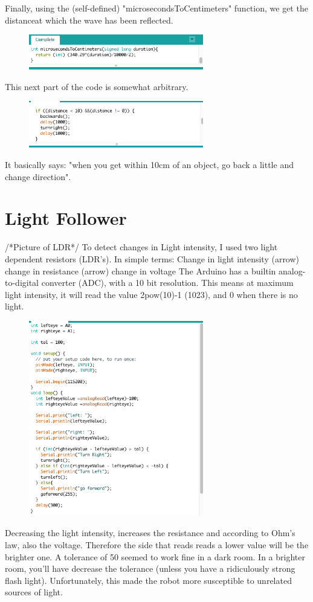 \documentclass[final,3p,times,twocolumn]{elsarticle}
\begin{document}
Finally, using the (self-defined) "microsecondsToCentimeters" function, we get the distanceat which the wave has been reflected.
\begin{figure}[h!]
\includegraphics[trim={0cm 0cm 0cm 0cm}, clip, width=3in]{./media/sonarDistanceFunction.jpg}
\end{figure}
This next part of the code is somewhat arbitrary.
\begin{figure}[h!]
\includegraphics[trim={0cm 0cm 0cm 0cm}, clip, width=3in]{./media/obstacleAvoidance.jpg}
\end{figure}
It basically says: "when you get within 10cm of an object, go back a little and change direction".

\section{Light Follower}
/*Picture of LDR*/
To detect changes in Light intensity, I used two light dependent resistors (LDR's).
In simple terms:
Change in light intensity (arrow) change in resistance (arrow) change in voltage
The Arduino has a builtin analog-to-digital converter (ADC), with a 10 bit resolution.
This means at maximum light intensity, it will read the value 2pow(10)-1 (1023), and 0 when there is no light.
\begin{figure}[h!]
\includegraphics[trim={0cm 0cm 0cm 0cm}, clip, width=3in]{./media/lightFollower.jpg}
\end{figure}
Decreasing the light intensity, increases the resistance and according to Ohm's law, also the voltage.
Therefore the side that reads reads a lower value will be the brighter one.
A tolerance of 50 seemed to work fine in a dark room. In a brighter room, you'll have decrease the tolerance (unless you have a ridiculously strong flash light).
Unfortunately, this made the robot more susceptible to unrelated sources of light. 
\end{document}
